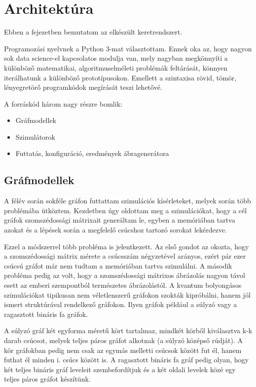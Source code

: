 \chapter{Architektúra}

Ebben a fejezetben bemutatom az elkészült keretrendszert.

Programozási nyelvnek a Python 3-mat választottam. Ennek oka az, hogy nagyon
sok data science-el kapcsolatos modulja van, mely nagyban megkönnyíti a különböző
matematikai, algoritmuselméleti problémák feltárását, könnyen iterálhatunk
a különböző prototípusokon. Emellett a szintaxisa rövid, tömör, lényegretörő
programkódok megírását teszi lehetővé.

A forráskód három nagy részre bomlik:
\begin{itemize}
  \item Gráfmodellek
  \item Szimulátorok
  \item Futtatás, konfiguráció, eredmények ábragenerátora
\end{itemize}

\section{Gráfmodellek}

A félév során sokféle gráfon futtattam szimulációs kísérleteket, melyek során
több problémába ütköztem. Kezdetben úgy oldottam meg a szimulációkat, hogy a
cél gráfok szomszédossági mátrixait generáltam le, egyben a memóriában tartva
azokat és a lépések során a megfelelő csúcshoz tartozó sorokat lekérdezve.

Ezzel a módszerrel több probléma is jelentkezett. Az első gondot az okozta, hogy
a szomszédossági mátrix mérete a csúcsszám négyzetével arányos, ezért pár ezer
csúcsú gráfot már nem tudtam a memóriában tartva szimulálni. A második probléma
pedig az volt, hogy a szomszédossági mátrixos ábrázolás nagyon távol esett
az emberi szempontból természetes ábrázolástól. A kvantum bolyongásos szimulációkat
tipikusan nem véletlenszerű gráfokon szokták kipróbálni, hanem jól ismert struktúrával
rendelkező gráfokon. Ilyen gráfok például a súlyzó vagy a ragasztott bináris fa gráfok.

A súlyzó gráf két egyforma méretű kört tartalmaz, mindkét körből kiválasztva k-k
darab csúcsot, melyek teljes páros gráfot alkotnak (a súlyzó középső rúdját).
A kör gráfokban pedig nem csak az egymás melletti csúcsok között fut él, hanem
futhat él minden i. csúcs között is. A ragasztott bináris fa gráf pedig olyan,
hogy két teljes bináris gráf leveleit szembefordítjuk és a két oldali levelek
közé egy teljes páros gráfot készítünk.

